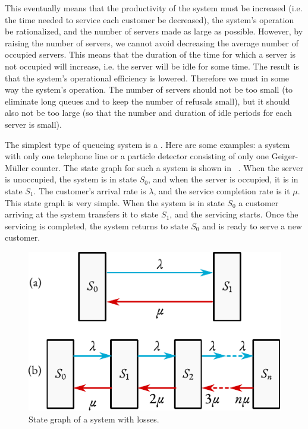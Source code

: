 This eventually means that the productivity of the system must be increased (i.e. the time needed to service each customer be decreased), the system's
operation be rationalized, and the number of servers made as large as
possible. However, by raising the number of servers, we cannot avoid
decreasing the average number of occupied servers. This means that the
duration of the time for which a server is not occupied will increase,
i.e. the server will be idle for some time. The result is that the
system's operational efficiency is lowered. Therefore we must in some
way  the system's operation. The number of servers should not
be too small (to eliminate long queues and to keep the number of
refusals small), but it should also not be too large (so that the
number and duration of idle periods for each server is small).

 The simplest type of queueing system is
a . Here are some examples: a system with only one telephone line or a particle detector consisting of only one
Geiger-M\"uller counter. The state graph for such a system is shown in ~. When the server is unoccupied, the system is in state $S_{0}$, and when the server is occupied, it is in state $S_{1}$. The customer’s arrival rate is $\lambda$, and the service completion rate is it $\mu$. This state graph is very simple. When the system is in state $S_{0}$ a customer arriving at the system transfers it to state $S_{1}$, and the servicing starts. Once the servicing is completed, the system returns to state $S_{0}$ and is ready to serve a new customer.
 \begin{figure}[!h]
 \centering
 \includegraphics[width=0.75\tfwidth]{figures/state-graph3.pdf}
\caption{State graph of a system with losses.\label{state-graph3}}
 \end{figure}

